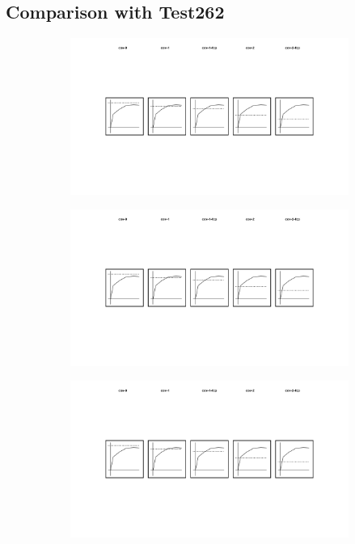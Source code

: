 \subsection{Comparison with Test262}\label{sec:compare-test262}

\todo

\begin{figure}
  \centering
  \begin{subfigure}{0.19\textwidth}
    \centering
    \includegraphics[width=\textwidth]{img/cov-0}
  \end{subfigure}
  \begin{subfigure}{0.19\textwidth}
    \centering
    \includegraphics[width=\textwidth]{img/cov-1}
  \end{subfigure}
  \begin{subfigure}{0.19\textwidth}
    \centering
    \includegraphics[width=\textwidth]{img/cov-1-fcp}

\end{subfigure}
\end{figure}
